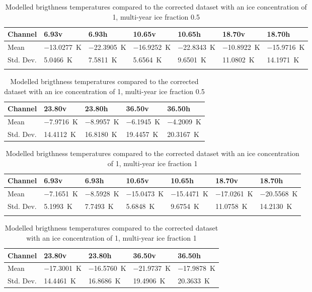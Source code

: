 \documentclass[11pt, a4paper]{article}
\begin{document}
\begin{table}[h!]
\centering
\begin{tabular}{@{} l l l l l l l @{}}
Channel & 6.93v & 6.93h & 10.65v & 10.65h & 18.70v & 18.70h \\
\midrule
Mean & \SI{-13.0277}{K} & \SI{-22.3905}{K} & \SI{-16.9252}{K} & \SI{-22.8343}{K} & \SI{-10.8922}{K} & \SI{-15.9716}{K} \\
Std. Dev. & \SI{5.0466}{K} & \SI{7.5811}{K} & \SI{5.6564}{K} & \SI{9.6501}{K} & \SI{11.0802}{K} & \SI{14.1971}{K} \\
\midrule
\tabularnewline
\end{tabular}
\begin{tabular}{@{} l l l l l @{}}
Channel & 23.80v & 23.80h & 36.50v & 36.50h \\
\midrule
Mean & \SI{-7.9716}{K} & \SI{-8.9957}{K} & \SI{-6.1945}{K} & \SI{-4.2009}{K} \\
Std. Dev. & \SI{14.4112}{K} & \SI{16.8180}{K} & \SI{19.4457}{K} & \SI{20.3167}{K} \\
\midrule
\end{tabular}
\caption{Modelled brigthness temperatures compared to the corrected dataset with an ice concentration of 1, multi-year ice fraction 0.5}
\label{tab:for1_5}
\end{table}



\begin{table}[h!]
\centering
\begin{tabular}{@{} l l l l l l l @{}}
Channel & 6.93v & 6.93h & 10.65v & 10.65h & 18.70v & 18.70h \\
\midrule
Mean & \SI{-7.1651}{K} & \SI{-8.5928}{K} & \SI{-15.0473}{K} & \SI{-15.4471}{K} & \SI{-17.0261}{K} & \SI{-20.5568}{K} \\
Std. Dev. & \SI{5.1993}{K} & \SI{7.7493}{K} & \SI{5.6848}{K} & \SI{9.6754}{K} & \SI{11.0758}{K} & \SI{14.2130}{K} \\
\midrule
\tabularnewline
\end{tabular}
\begin{tabular}{@{} l l l l l @{}}
Channel & 23.80v & 23.80h & 36.50v & 36.50h \\
\midrule
Mean & \SI{-17.3001}{K} & \SI{-16.5760}{K} & \SI{-21.9737}{K} & \SI{-17.9878}{K} \\
Std. Dev. & \SI{14.4461}{K} & \SI{16.8686}{K} & \SI{19.4906}{K} & \SI{20.3633}{K}  \\
\midrule
\end{tabular}
\caption{Modelled brigthness temperatures compared to the corrected dataset with an ice concentration of 1, multi-year ice fraction 1}
\label{tab:for1_1}
\end{table}
\end{document}
